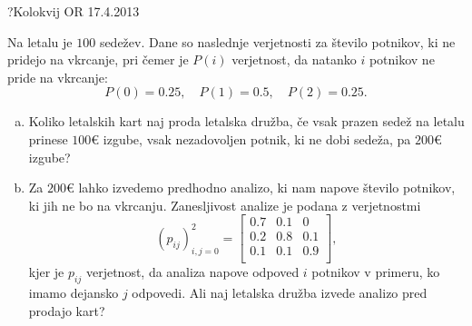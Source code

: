 \begin{naloga}{?}{Kolokvij OR 17.4.2013}
\begin{vprasanje}[letalskekarte]
Na letalu je $100$ sedežev.
Dane so naslednje verjetnosti za število potnikov,
ki ne pridejo na vkrcanje,
pri čemer je $P(i)$ verjetnost, da natanko $i$ potnikov ne pride na vkrcanje:
$$
P(0) = 0.25, \quad P(1) = 0.5, \quad P(2) = 0.25 .
$$
\begin{enumerate}[(a)]
\item Koliko letalskih kart naj proda letalska družba,
če vsak prazen sedež na letalu prinese $100 €$ izgube,
vsak nezadovoljen potnik, ki ne dobi sedeža, pa $200 €$ izgube?

\item Za $200 €$ lahko izvedemo predhodno analizo,
ki nam napove število potnikov, ki jih ne bo na vkrcanju.
Zanesljivost analize je podana z verjetnostmi
$$
(p_{ij})_{i,j=0}^2 = \begin{bmatrix}
0.7 & 0.1 & 0 \\
0.2 & 0.8 & 0.1 \\
0.1 & 0.1 & 0.9 \\
\end{bmatrix} ,
$$
kjer je $p_{ij}$ verjetnost,
da analiza napove odpoved $i$ potnikov v primeru,
ko imamo dejansko $j$ odpovedi.
Ali naj letalska družba izvede analizo pred prodajo kart?
\end{enumerate}
\end{vprasanje}
\begin{odgovor}
\end{odgovor}
\end{naloga}



